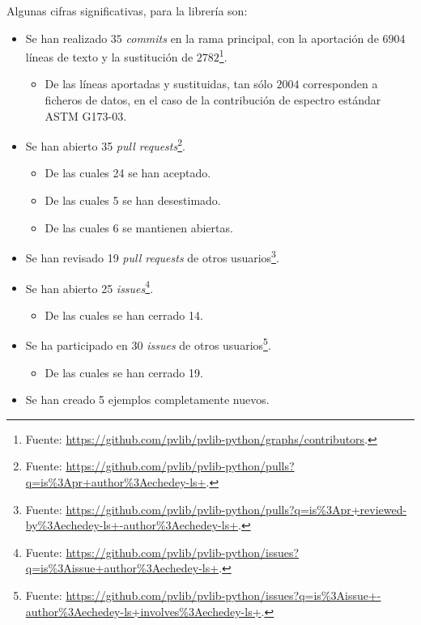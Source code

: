 Algunas cifras significativas, para la librería \pvlibpy{} son:

\begin{itemize}
    \item Se han realizado $35$ \textit{commits} en la \gls{rama} principal, con la aportación de $6904$ líneas de texto y la sustitución de $2782$\footnote{Fuente: \url{https://github.com/pvlib/pvlib-python/graphs/contributors}.}.
          \begin{itemize}
            \item De las líneas aportadas y sustituidas, tan sólo $2004$ corresponden a ficheros de datos, en el caso de la contribución de espectro \gls{estándar} ASTM G173-03.
          \end{itemize}
    \item Se han abierto 35 \textit{pull requests}\footnote{Fuente: \url{https://github.com/pvlib/pvlib-python/pulls?q=is\%3Apr+author\%3Aechedey-ls+}.}.
          \begin{itemize}
              \item De las cuales 24 se han aceptado.
              \item De las cuales 5 se han desestimado.
              \item De las cuales 6 se mantienen abiertas.
          \end{itemize}
    \item Se han revisado 19 \textit{pull requests} de otros usuarios\footnote{Fuente: \url{https://github.com/pvlib/pvlib-python/pulls?q=is\%3Apr+reviewed-by\%3Aechedey-ls+-author\%3Aechedey-ls+}.}.
    \item Se han abierto 25 \textit{issues}\footnote{Fuente: \url{https://github.com/pvlib/pvlib-python/issues?q=is\%3Aissue+author\%3Aechedey-ls+}.}.
          \begin{itemize}
              \item De las cuales se han cerrado 14.
          \end{itemize}
    \item Se ha participado en 30 \textit{issues} de otros usuarios\footnote{Fuente: \url{https://github.com/pvlib/pvlib-python/issues?q=is\%3Aissue+-author\%3Aechedey-ls+involves\%3Aechedey-ls+}.}.
          \begin{itemize}
              \item De las cuales se han cerrado 19.
          \end{itemize}
    \item Se han creado 5 ejemplos completamente nuevos.
\end{itemize}

